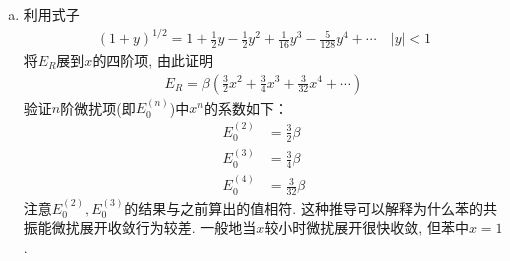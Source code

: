 {\begin{enumerate}[a.]
	\begin{align*}
	E_R = 4\beta(\frac{1}{2}x-1+(1+x^2-x)^{1/2})
	\end{align*}
	注意当$x=0$时$E_R=0$, 当$x=1$时$E_R=2\beta$, 这结果为精确的.
	\item
	利用式子
	\begin{align*}
	(1+y)^{1/2} = 1 + \frac{1}{2}y -\frac{1}{2}y^2 + \frac{1}{16}y^3 - \frac{5}{128}y^4 + \cdots\quad|y|<1
 	\end{align*}
 	将$E_R$展到$x$的四阶项, 由此证明
 	\begin{align*}
 	E_R = \beta(\frac{3}{2}x^2+\frac{3}{4}x^3 + \frac{3}{32}x^4+\cdots)
 	\end{align*}
 	验证$n$阶微扰项(即$E_0^{(n)}$)中$x^n$的系数如下：
 	\begin{align*}
 	E_0^{(2)} & = \frac{3}{2}\beta\\
 	E_0^{(3)} & = \frac{3}{4}\beta\\
 	E_0^{(4)} & = \frac{3}{32}\beta
 	\end{align*}
 	注意$E_0^{(2)},E_0^{(3)}$的结果与之前算出的值相符. 这种推导可以解释为什么苯的共振能微扰展开收敛行为较差. 一般地当$x$较小时微扰展开很快收敛, 但苯中$x=1$.
 	

\end{enumerate}}
